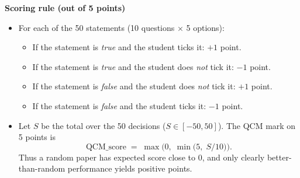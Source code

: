 \documentclass[a4paper,11pt]{article}
\begin{document}
\bigskip
\noindent\textbf{Scoring rule (out of 5 points)}
\begin{itemize}
  \item For each of the 50 statements (10 questions $\times$ 5 options):
    \begin{itemize}
      \item If the statement is \emph{true} and the student ticks it: $+1$ point.
      \item If the statement is \emph{true} and the student does \emph{not} tick it: $-1$ point.
      \item If the statement is \emph{false} and the student does \emph{not} tick it: $+1$ point.
      \item If the statement is \emph{false} and the student ticks it: $-1$ point.
    \end{itemize}
  \item Let $S$ be the total over the 50 decisions ($S\in[-50,50]$). The QCM mark on 5 points is
  \[
    \text{QCM\_score} \;=\; \max\bigl(0,\; \min\bigl(5,\; S/10\bigr)\bigr).
  \]
  Thus a random paper has expected score close to $0$, and only clearly better-than-random performance yields positive points.
\end{itemize}
\end{document}
